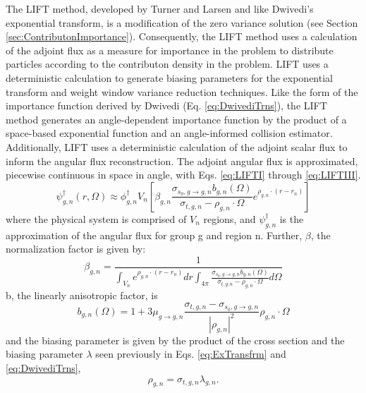 The LIFT \cite{turner_automatic_1997, turner_automatic_1997-1} method,
developed by Turner and Larsen and like Dwivedi's exponential transform, is
a modification
of the zero variance solution (see Section \ref{sec:ContributonImportance}).
Consequently, the LIFT method uses a calculation of the adjoint flux as a measure
for importance in the problem to distribute particles according to the
contributon density in the problem.
LIFT uses a deterministic calculation to
generate biasing
parameters for the exponential transform and weight window variance reduction
techniques.
Like the form of the importance function derived by Dwivedi (Eq.
\eqref{eq:DwivediTrns}), the LIFT method generates an angle-dependent importance
function by the product of a space-based exponential function and an
angle-informed collision estimator. Additionally, LIFT uses a deterministic
calculation of the adjoint scalar flux to inform the angular flux
reconstruction.
The adjoint angular flux is approximated, piecewise continuous in space
in angle,
with Eqs. \eqref{eq:LIFTI} through \eqref{eq:LIFTIII}.
\label{LIFT}
\begin{equation}
\psi^{\dagger}_{g,n} (r,\Omega) \approx
                \phi^{\dagger}_{g,n}V_n \left[ \beta_{g,n}
                \frac{\sigma_{s_0,g \rightarrow g,n} b_{g,n}(\Omega)}{\sigma_{t,g,n} -
                \rho_{g,n}\cdot \Omega} e^{\rho_{g,n}\cdot (r-r_n)} \right]
                \label{eq:LIFTI}
\end{equation}
where the physical system is comprised of $V_n$ regions, and
$\psi^{\dagger}_{g,n}$ is the
approximation of the angular flux for group g and region n. Further, $\beta$,
the normalization
factor is given by:
\begin{equation}
\beta_{g,n} = \frac{1}{\int_{V_n} e^{\rho_{g,n} \cdot (r-r_n)} dr \int_{4\pi}
              \frac{\sigma_{s_0,g \rightarrow g,n} b_{g,n}(\Omega)}{\sigma_{t,g,n} -
              \rho_{g,n}\cdot \Omega} d\Omega}
\end{equation}
b, the linearly anisotropic factor, is
\begin{equation}
b_{g,n}(\Omega) = 1 + 3\mu_{g\rightarrow g,n}\frac{\sigma_{t,g,n} -
                      \sigma_{s_0,g\rightarrow g,n}}{{\left| \rho_{g,n}
                      \right|}^2}\rho_{g,n}\cdot \Omega
\end{equation}
and the biasing parameter is given by the product of the cross section and the
biasing parameter $\lambda$ seen previously in Eqs. \eqref{eq:ExTransfrm}
and \eqref{eq:DwivediTrns},
\begin{equation}
  \rho_{g,n} = \sigma_{t,g,n} \lambda_{g,n} .
  \label{eq:LIFTIII}
\end{equation}
